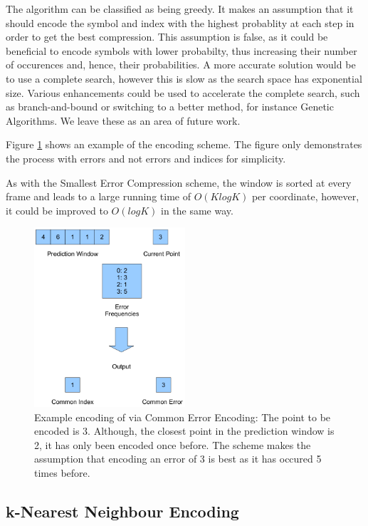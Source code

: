 \documentclass[a4paper,11pt]{report}
\begin{document}
The algorithm can be classified as being greedy. It makes an assumption that it should encode the symbol and index with the highest probablity at each step in order to get the best compression. This assumption is false, as it could be beneficial to encode symbols with lower probabilty, thus increasing their number of occurences and, hence, their probabilities. A more accurate solution would be to use a complete search, however this is slow as the search space has exponential size. Various enhancements could be used to accelerate the complete search, such as branch-and-bound or switching to a better method, for instance Genetic Algorithms. We leave these as an area of future work.

Figure \ref{CommonDescrip} shows an example of the encoding scheme. The figure only demonstrates the process with errors and not errors and indices for simplicity.

As with the Smallest Error Compression scheme, the window is sorted at every frame and leads to a large running time of $O(KlogK)$ per coordinate, however, it could be improved to $O(logK)$ in the same way.

\begin{figure}
 \center
 \includegraphics[width=0.5\textwidth]{resources/Common.png}
\caption{Example encoding of via Common Error Encoding: The point to be encoded is 3. Although, the closest point in the prediction window is 2, it has only been encoded once before. The scheme makes the assumption that encoding an error of 3 is best as it has occured 5 times before.}
\label{CommonDescrip}
\end{figure}

\subsection{k-Nearest Neighbour Encoding}
\end{document}
